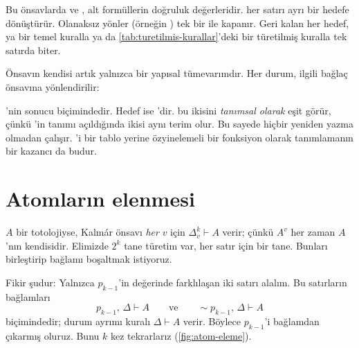\noindent Bu önsavlarda  ve , alt formüllerin doğruluk
değerleridir.  her satırı ayrı bir hedefe
dönüştürür. Olanaksız yönler (örneğin ) tek bir
 ile kapanır. Geri kalan her hedef, ya bir temel
kuralla ya da \cref{tab:turetilmis-kurallar}'deki bir türetilmiş
kuralla tek satırda biter.

Önsavın kendisi artık yalnızca bir yapısal tümevarımdır. Her durum, ilgili
bağlaç önsavına yönlendirilir:


\begin{dikkat}
'nin sonucu  biçimindedir.
Hedef ise 'dir. \Lean{} bu ikisini
\emph{tanımsal olarak} eşit görür, çünkü 'in tanımı açıldığında
ikisi aynı terim olur. Bu sayede  hiçbir yeniden yazma
olmadan çalışır. 'i bir tablo yerine özyinelemeli bir fonksiyon
olarak tanımlamanın bir kazancı da budur.
\end{dikkat}

\section{Atomların elenmesi}\label{sec:atom-eleme}

$A$ bir totolojiyse, Kalmár önsavı \emph{her} $v$ için $\Delta_v^k
\vdash A$ verir; çünkü $A^v$ her zaman $A$'nın kendisidir. Elimizde
$2^k$ tane türetim var, her satır için bir tane. Bunları birleştirip
bağlamı boşaltmak istiyoruz.

Fikir şudur: Yalnızca $p_{k-1}$'in değerinde farklılaşan iki satırı
alalım. Bu satırların bağlamları
\[
  p_{k-1},\, \Delta \vdash A
  \qquad\text{ve}\qquad
  {\sim}p_{k-1},\, \Delta \vdash A
\]
biçimindedir; durum ayrımı kuralı $\Delta \vdash A$ verir. Böylece
$p_{k-1}$'i bağlamdan çıkarmış oluruz. Bunu $k$ kez tekrarlarız
(\cref{fig:atom-eleme}).

